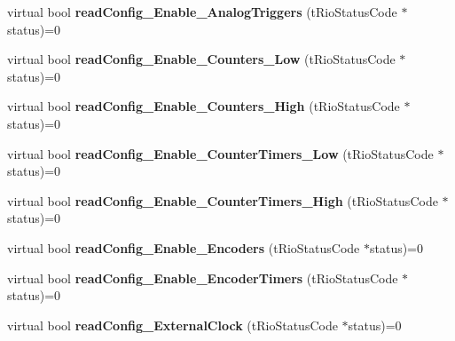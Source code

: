 \begin{DoxyCompactItemize}
\item 
\hypertarget{classnFPGA_1_1nFRC__2012__1__6__4_1_1tDMA_ae45291751cafa7cb49dd7b99e7341493}{
virtual bool {\bfseries readConfig\_\-Enable\_\-AnalogTriggers} (tRioStatusCode $\ast$status)=0}
\label{classnFPGA_1_1nFRC__2012__1__6__4_1_1tDMA_ae45291751cafa7cb49dd7b99e7341493}

\item 
\hypertarget{classnFPGA_1_1nFRC__2012__1__6__4_1_1tDMA_af0e155b7366ca1cd06880bf100feedac}{
virtual bool {\bfseries readConfig\_\-Enable\_\-Counters\_\-Low} (tRioStatusCode $\ast$status)=0}
\label{classnFPGA_1_1nFRC__2012__1__6__4_1_1tDMA_af0e155b7366ca1cd06880bf100feedac}

\item 
\hypertarget{classnFPGA_1_1nFRC__2012__1__6__4_1_1tDMA_ae2a68433e793a29cfdf1c3cdeaae3b15}{
virtual bool {\bfseries readConfig\_\-Enable\_\-Counters\_\-High} (tRioStatusCode $\ast$status)=0}
\label{classnFPGA_1_1nFRC__2012__1__6__4_1_1tDMA_ae2a68433e793a29cfdf1c3cdeaae3b15}

\item 
\hypertarget{classnFPGA_1_1nFRC__2012__1__6__4_1_1tDMA_a2bcd54cedfb8169be56061c832ed1200}{
virtual bool {\bfseries readConfig\_\-Enable\_\-CounterTimers\_\-Low} (tRioStatusCode $\ast$status)=0}
\label{classnFPGA_1_1nFRC__2012__1__6__4_1_1tDMA_a2bcd54cedfb8169be56061c832ed1200}

\item 
\hypertarget{classnFPGA_1_1nFRC__2012__1__6__4_1_1tDMA_a43a3e1f7e8192727a4effc88d32712bf}{
virtual bool {\bfseries readConfig\_\-Enable\_\-CounterTimers\_\-High} (tRioStatusCode $\ast$status)=0}
\label{classnFPGA_1_1nFRC__2012__1__6__4_1_1tDMA_a43a3e1f7e8192727a4effc88d32712bf}

\item 
\hypertarget{classnFPGA_1_1nFRC__2012__1__6__4_1_1tDMA_a4ff37f659e4d798c501e8d38a6c8d24d}{
virtual bool {\bfseries readConfig\_\-Enable\_\-Encoders} (tRioStatusCode $\ast$status)=0}
\label{classnFPGA_1_1nFRC__2012__1__6__4_1_1tDMA_a4ff37f659e4d798c501e8d38a6c8d24d}

\item 
\hypertarget{classnFPGA_1_1nFRC__2012__1__6__4_1_1tDMA_a3b6616f97d883eba9afbbd25364f93d6}{
virtual bool {\bfseries readConfig\_\-Enable\_\-EncoderTimers} (tRioStatusCode $\ast$status)=0}
\label{classnFPGA_1_1nFRC__2012__1__6__4_1_1tDMA_a3b6616f97d883eba9afbbd25364f93d6}

\item 
\hypertarget{classnFPGA_1_1nFRC__2012__1__6__4_1_1tDMA_a95f89b51f67d26824e125b1c43ce811d}{
virtual bool {\bfseries readConfig\_\-ExternalClock} (tRioStatusCode $\ast$status)=0}
\label{classnFPGA_1_1nFRC__2012__1__6__4_1_1tDMA_a95f89b51f67d26824e125b1c43ce811d}


\end{DoxyCompactItemize}
